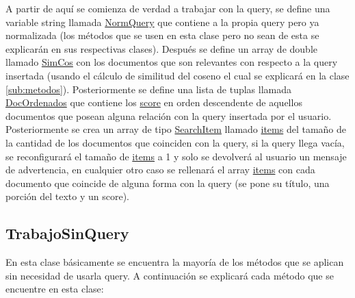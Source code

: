 \documentclass[a4paper,12pt]{article}
\begin{document}
A partir de aquí se comienza de verdad a trabajar con la query, se define una variable string llamada \underline{NormQuery} que contiene 
a la propia query pero ya normalizada (los métodos que se usen en esta clase pero no sean de esta se explicarán en sus respectivas clases). 
Después se define un array de double llamado \underline{SimCos} con los documentos que son relevantes con respecto a la query insertada 
(usando el cálculo de similitud del coseno el cual se explicará en la clase \ref{sub:metodos}). Posteriormente se define una lista de tuplas 
llamada \underline{DocOrdenados} que contiene los \underline{score} en orden descendente de aquellos documentos que posean alguna 
relación con la query insertada por el usuario. Posteriormente se crea un array de tipo \underline{SearchItem} llamado \underline{items} del 
tamaño de la cantidad de los documentos que coinciden con la query, si la query llega vacía, se reconfigurará el tamaño de \underline{items} 
a 1 y solo se devolverá al usuario un mensaje de advertencia, en cualquier otro caso se rellenará el array \underline{items} con cada documento 
que coincide de alguna forma con la query (se pone su título, una porción del texto y un score).

\subsection{TrabajoSinQuery}\label{sub:TSQ}

En esta clase básicamente se encuentra la mayoría de los métodos que se aplican sin necesidad de usarla query. A continuación se explicará cada
método que se encuentre en esta clase:
\end{document}
